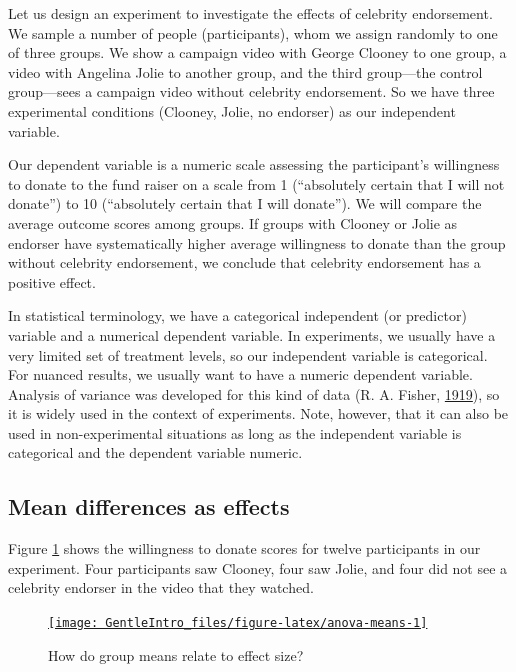 \documentclass[a4paper]{book}
\theoremstyle{definition}
\theoremstyle{definition}
\theoremstyle{definition}
\theoremstyle{remark}
\begin{document}
Let us design an experiment to investigate the effects of celebrity
endorsement. We sample a number of people (participants), whom we assign
randomly to one of three groups. We show a campaign video with George
Clooney to one group, a video with Angelina Jolie to another group, and
the third group---the control group---sees a campaign video without
celebrity endorsement. So we have three experimental conditions
(Clooney, Jolie, no endorser) as our independent variable.

Our dependent variable is a numeric scale assessing the participant's
willingness to donate to the fund raiser on a scale from 1 (``absolutely
certain that I will not donate'') to 10 (``absolutely certain that I
will donate''). We will compare the average outcome scores among groups.
If groups with Clooney or Jolie as endorser have systematically higher
average willingness to donate than the group without celebrity
endorsement, we conclude that celebrity endorsement has a positive
effect.

In statistical terminology, we have a categorical independent (or
predictor) variable and a numerical dependent variable. In experiments,
we usually have a very limited set of treatment levels, so our
independent variable is categorical. For nuanced results, we usually
want to have a numeric dependent variable. Analysis of variance was
developed for this kind of data (R. A. Fisher,
\protect\hyperlink{ref-RefWorks:3955}{1919}), so it is widely used in
the context of experiments. Note, however, that it can also be used in
non-experimental situations as long as the independent variable is
categorical and the dependent variable numeric.

\subsection{Mean differences as effects}\label{anova-meandiffs}

Figure \ref{fig:anova-means} shows the willingness to donate scores for
twelve participants in our experiment. Four participants saw Clooney,
four saw Jolie, and four did not see a celebrity endorser in the video
that they watched.

\begin{figure}[H]
\href{http://82.196.4.233:3838/apps/anova-means/}{\texttt{[image: GentleIntro\_files/figure-latex/anova-means-1]} }\caption{How do group means relate to effect size?}\label{fig:anova-means}
\end{figure}
\end{document}
